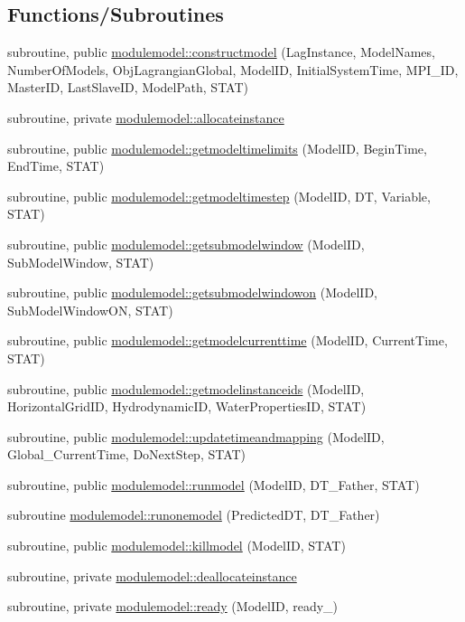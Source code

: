 \subsection*{Functions/\+Subroutines}
\begin{DoxyCompactItemize}
\item 
subroutine, public \mbox{\hyperlink{namespacemodulemodel_a26ba9ff74ca1066f7a87bd019c76b1ed}{modulemodel\+::constructmodel}} (Lag\+Instance, Model\+Names, Number\+Of\+Models, Obj\+Lagrangian\+Global, Model\+ID, Initial\+System\+Time, M\+P\+I\+\_\+\+ID, Master\+ID, Last\+Slave\+ID, Model\+Path, S\+T\+AT)
\item 
subroutine, private \mbox{\hyperlink{namespacemodulemodel_a5bbc8de2114f1ac7367a9db6d923e85a}{modulemodel\+::allocateinstance}}
\item 
subroutine, public \mbox{\hyperlink{namespacemodulemodel_a4273c6982391135a62686fbcf6a0861c}{modulemodel\+::getmodeltimelimits}} (Model\+ID, Begin\+Time, End\+Time, S\+T\+AT)
\item 
subroutine, public \mbox{\hyperlink{namespacemodulemodel_a548beb7d8ae7799facee13efde759d64}{modulemodel\+::getmodeltimestep}} (Model\+ID, DT, Variable, S\+T\+AT)
\item 
subroutine, public \mbox{\hyperlink{namespacemodulemodel_a61debfb6b3b629e1cd4bbdfe3c1c1ad1}{modulemodel\+::getsubmodelwindow}} (Model\+ID, Sub\+Model\+Window, S\+T\+AT)
\item 
subroutine, public \mbox{\hyperlink{namespacemodulemodel_a2bb34f8b006f66681bc7e7276eb4579e}{modulemodel\+::getsubmodelwindowon}} (Model\+ID, Sub\+Model\+Window\+ON, S\+T\+AT)
\item 
subroutine, public \mbox{\hyperlink{namespacemodulemodel_a16524bfd3d2f97fbf9b45e5e99e495e8}{modulemodel\+::getmodelcurrenttime}} (Model\+ID, Current\+Time, S\+T\+AT)
\item 
subroutine, public \mbox{\hyperlink{namespacemodulemodel_a542c4b413e51723c7c3826e7a1e3b8a6}{modulemodel\+::getmodelinstanceids}} (Model\+ID, Horizontal\+Grid\+ID, Hydrodynamic\+ID, Water\+Properties\+ID, S\+T\+AT)
\item 
subroutine, public \mbox{\hyperlink{namespacemodulemodel_a4eb372bc7bfa08656aec97c250f8cf7b}{modulemodel\+::updatetimeandmapping}} (Model\+ID, Global\+\_\+\+Current\+Time, Do\+Next\+Step, S\+T\+AT)
\item 
subroutine, public \mbox{\hyperlink{namespacemodulemodel_a16a07d5b28a4877790acec46aed111b6}{modulemodel\+::runmodel}} (Model\+ID, D\+T\+\_\+\+Father, S\+T\+AT)
\item 
subroutine \mbox{\hyperlink{namespacemodulemodel_ab22d85061a595a03c83c11766cba5587}{modulemodel\+::runonemodel}} (Predicted\+DT, D\+T\+\_\+\+Father)
\item 
subroutine, public \mbox{\hyperlink{namespacemodulemodel_a23647852257627fb606f6868bc295162}{modulemodel\+::killmodel}} (Model\+ID, S\+T\+AT)
\item 
subroutine, private \mbox{\hyperlink{namespacemodulemodel_aa1baf5876ac43380b98e011bcf1517da}{modulemodel\+::deallocateinstance}}
\item 
subroutine, private \mbox{\hyperlink{namespacemodulemodel_af5d93bbd065add89f5cd52475a40e7fc}{modulemodel\+::ready}} (Model\+ID, ready\+\_\+)
\end{DoxyCompactItemize}
